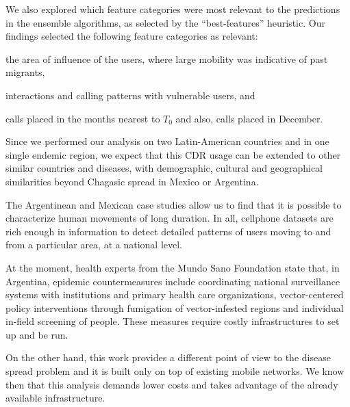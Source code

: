 We also explored which feature categories were most relevant to the predictions in the ensemble algorithms, as selected by the ``best-features'' heuristic.
Our findings selected the following feature categories as relevant:
\begin{enumerate*}[label={\alph*)},]
\item the area of influence of the users, where large mobility was indicative of past migrants,
\item interactions and calling patterns with vulnerable users, and
\item calls placed in the months nearest to $T_0$ and also, calls placed in December.
\end{enumerate*}




Since we performed our analysis on two Latin-American countries and in one single endemic region, we expect that this CDR usage can be extended to other similar countries and diseases, with demographic, cultural and geographical similarities beyond Chagasic spread in Mexico or Argentina.

The Argentinean and Mexican case studies allow us to find that it is possible to characterize human movements of long duration.
In all, cellphone datasets are rich enough in information to detect detailed patterns of users moving to and from a particular area, at a national level.


At the moment, health experts from the Mundo Sano Foundation state that, in Argentina, epidemic countermeasures include coordinating national surveillance systems with institutions and primary health care organizations, vector-centered policy interventions through fumigation of vector-infested regions and individual in-field screening of people.
These measures require costly infrastructures to set up and be run.

On the other hand, this work provides a different point of view to the disease spread problem and it is built only on top of existing mobile networks.
We know then that this analysis demands lower costs and takes advantage of the already available infrastructure.

